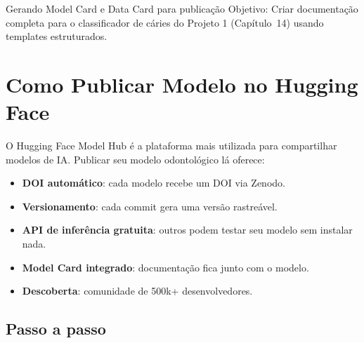 \begin{pratica}{Gerando Model Card e Data Card para publicação}
  Objetivo: Criar documentação completa para o classificador de cáries
  do Projeto 1 (Capítulo~14) usando templates estruturados.
\end{pratica}



\section{Como Publicar Modelo no Hugging Face}

O Hugging Face Model Hub é a plataforma mais utilizada para compartilhar
modelos de IA. Publicar seu modelo odontológico lá oferece:

\begin{itemize}
  \item \textbf{DOI automático}: cada modelo recebe um DOI via Zenodo.
  \item \textbf{Versionamento}: cada commit gera uma versão rastreável.
  \item \textbf{API de inferência gratuita}: outros podem testar seu
    modelo sem instalar nada.
  \item \textbf{Model Card integrado}: documentação fica junto com o modelo.
  \item \textbf{Descoberta}: comunidade de 500k+ desenvolvedores.
\end{itemize}

\subsection{Passo a passo}

